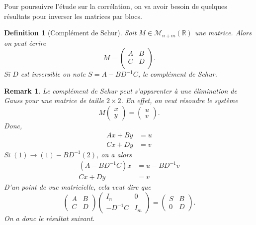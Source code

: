 \documentclass[10pt]{article}
\newtheorem{rem}[thm]{Remark}
\newtheorem{defn}[thm]{Definition}
\newcommand{\R}{\mathbb{R}}
\newcommand{\aM}{\mathcal{M}}
\begin{document}
Pour poursuivre l'étude sur la corrélation, on va avoir besoin de quelques résultats pour inverser les matrices par blocs.

\begin{defn}[Complément de Schur]
	Soit $M \in \aM_{n+m}(\R)$ une matrice. Alors on peut écrire
	\[
		M =
		\begin{pmatrix}
			A & B \\
			C & D \\
		\end{pmatrix}.
	\]
	Si $D$ est inversible on note $S = A - BD^{-1}C$, le complément de Schur.
\end{defn}

\begin{rem}
	Le complément de Schur peut s'apparenter à une élimination de Gauss pour une matrice de taille $2 \times 2$.
	En effet, on veut résoudre le système
	\[
		M
		\begin{pmatrix}
			x \\
			y
		\end{pmatrix}
		=
		\begin{pmatrix}
			u \\
			v
		\end{pmatrix}.
	\]
	Donc,
	\begin{align}
		A x + B y & = u \\
		C x + D y & = v
	\end{align}
	Si $(1) \to (1) - BD^{-1} (2)$, on a alors
	\begin{align}
		(A - B D^{-1} C) x & = u - B D^{-1}v \\
		C x + D y          & = v
	\end{align}
	D'un point de vue matricielle, cela veut dire que
	\[
		\begin{pmatrix}
			A & B \\
			C & D
		\end{pmatrix}
		\begin{pmatrix}
			I_n      & 0   \\
			-D^{-1}C & I_m
		\end{pmatrix} =
		\begin{pmatrix}
			S & B \\
			0 & D
		\end{pmatrix}.
	\]
	On a donc le résultat suivant.
\end{rem}
\end{document}
